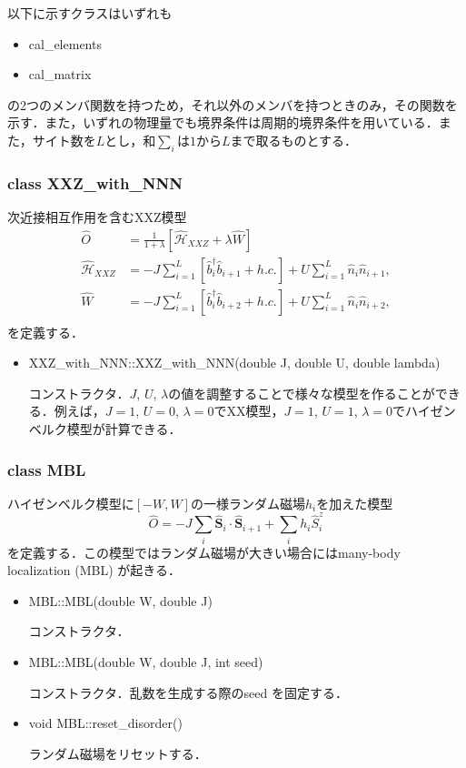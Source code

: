 \documentclass[report, 11pt, uplatex]{jsbook}
\newcommand{\ani}[2]{\hat{{#1}}_{#2}}
\newcommand{\cre}[2]{\hat{{#1}}_{#2}^{\dagger}}
\newcommand{\sbr}[1]{\left[#1\right]}
\newcommand{\hami}{{\mathcal{\hat{H}}}}
\begin{document}
	以下に示すクラスはいずれも
	\begin{itemize}
		\item cal\_elements
		\item cal\_matrix
	\end{itemize}
	の2つのメンバ関数を持つため，それ以外のメンバを持つときのみ，その関数を示す．また，いずれの物理量でも境界条件は周期的境界条件を用いている．また，サイト数を$L$とし，和$\sum_i$は$1$から$L$まで取るものとする．
	
	\subsubsection{class XXZ\_with\_NNN}
	次近接相互作用を含むXXZ模型
	\begin{align*}
	\hat{O}&=\frac{1}{1+\lambda}\sbr{\hami_{XXZ}+\lambda\hat{W}}\\
	\hami_{XXZ}&=-J\sum_{i=1}^{L}\sbr{\cre{b}{i}\ani{b}{i+1}+h.c.} +U\sum_{i=1}^{L}\hat{n}_i\hat{n}_{i+1},\nonumber\\
	\hat{W}&=-J\sum_{i=1}^{L}\sbr{\cre{b}{i}\ani{b}{i+2}+h.c.} +U\sum_{i=1}^{L}\hat{n}_i\hat{n}_{i+2},\nonumber\\
	\end{align*}
	を定義する．
	
	\begin{itemize}
		\item XXZ\_with\_NNN::XXZ\_with\_NNN(double J, double U, double lambda)
		
		コンストラクタ．$J$, $U$, $\lambda$の値を調整することで様々な模型を作ることができる．例えば，$J=1$, $U=0$, $\lambda = 0$でXX模型，$J=1$, $U=1$, $\lambda = 0$でハイゼンベルク模型が計算できる．
	\end{itemize}
	
	\subsubsection{class MBL}
	ハイゼンベルク模型に$[-W,W]$の一様ランダム磁場$h_i$を加えた模型
	\begin{equation}
	\hat{O}=-J\sum_{i}\mathbf{\hat{S}}_i\cdot\mathbf{\hat{S}}_{i+1}+\sum_ih_i\hat{S}^z_i\nonumber
	\end{equation}
	を定義する．この模型ではランダム磁場が大きい場合にはmany-body localization (MBL) が起きる．
	
	\begin{itemize}
		\item MBL::MBL(double W, double J)
		
		コンストラクタ．
		
		\item MBL::MBL(double W, double J, int seed)
		
		コンストラクタ．乱数を生成する際のseed を固定する．
		
		\item void MBL::reset\_disorder()
		
		ランダム磁場をリセットする．
	\end{itemize}
\end{document}
